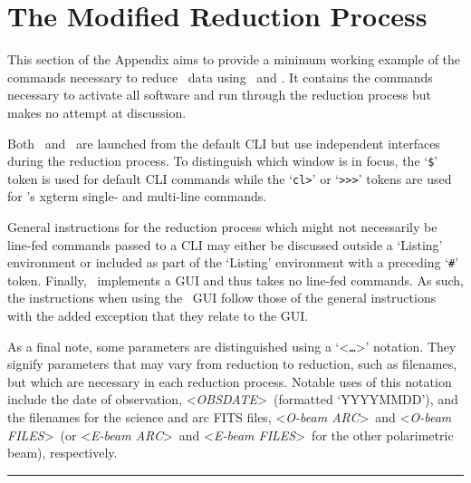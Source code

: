 \chapter{The Modified Reduction Process} \label{app:reduction}

\newcommand{\obj}{<\textit{OBJ}>}
\newcommand{\obsdate}{<\textit{OBSDATE}>}
\newcommand{\oarc}{<\textit{O-beam ARC}>}
\newcommand{\earc}{<\textit{E-beam ARC}>}
\newcommand{\ofiles}{<\textit{O-beam FILES}>}
\newcommand{\efiles}{<\textit{E-beam FILES}>}
\newcommand{\id}{01\_identify.cl}
\newcommand{\reid}{02\_reidentify.cl}
\newcommand{\fit}{03\_fitcoords.cl}
\newcommand{\tran}{04\_transform.cl}

This section of the Appendix aims to provide a minimum working example of the commands necessary to reduce \polsalt\ data using \stops\ and \iraf. It contains the commands necessary to activate all software and run through the reduction process but makes no attempt at discussion.

Both \polsalt\ and \iraf\ are launched from the default \gls{CLI} but use independent interfaces during the reduction process. To distinguish which window is in focus, the `\texttt{\$}' token is used for default \gls{CLI} commands while the `\texttt{cl>}' or `\texttt{>\->\->}' tokens are used for \iraf's xgterm single- and multi-line commands.

General instructions for the reduction process which might not necessarily be line-fed commands passed to a \gls{CLI} may either be discussed outside a `Listing' environment or included as part of the `Listing' environment with a preceding `\texttt{\#}' token. Finally, \polsalt\ implements a \gls{GUI} and thus takes no line-fed commands. As such, the instructions when using the \polsalt\ \gls{GUI} follow those of the general instructions with the added exception that they relate to the \gls{GUI}.

As a final note, some parameters are distinguished using a `<\texttt{\dots}>' notation. They signify parameters that may vary from reduction to reduction, such as filenames, but which are necessary in each reduction process. Notable uses of this notation include the date of observation, \obsdate\ (formatted `YYYYMMDD'), and the filenames for the science and arc \gls{FITS} files, \oarc\ and \ofiles\ (or \earc\ and \efiles\ for the other polarimetric beam), respectively.

\vspace{\baselineskip}\hrule\vspace{\baselineskip}

